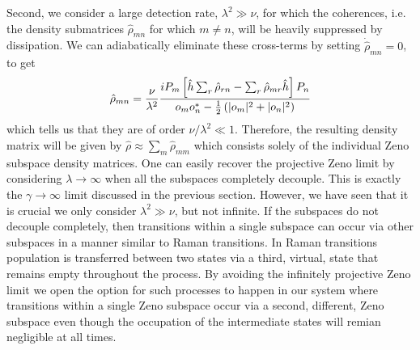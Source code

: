 Second, we consider a large detection rate, $\lambda^2 \gg \nu$, for
which the coherences, i.e.~ the density submatrices $\hat{\rho}_{mn}$
for which $m \ne n$, will be heavily suppressed by dissipation. We can
adiabatically eliminate these cross-terms by setting
$\dot{\hat{\rho}}_{mn} = 0$, to get
\begin{equation}
\label{eq:intermediate}
\hat{\rho}_{mn} = \frac{\nu}{\lambda^2} \frac{i P_m \left[ \hat{h} \sum_r \hat{\rho}_{rn} - \sum_r \hat{\rho}_{mr} \hat{h} \right] P_n } {o_m o_n^* - \frac{1}{2} \left( |o_m|^2 + |o_n|^2 \right)}
\end{equation}
which tells us that they are of order $\nu/\lambda^2 \ll
1$. Therefore, the resulting density matrix will be given by
$\hat{\rho} \approx \sum_m \hat{\rho}_{mm}$ which consists solely of
the individual Zeno subspace density matrices. One can easily recover
the projective Zeno limit by considering $\lambda \rightarrow \infty$
when all the subspaces completely decouple. This is exactly the
$\gamma \rightarrow \infty$ limit discussed in the previous
section. However, we have seen that it is crucial we only consider
$\lambda^2 \gg \nu$, but not infinite. If the subspaces do not
decouple completely, then transitions within a single subspace can
occur via other subspaces in a manner similar to Raman transitions. In
Raman transitions population is transferred between two states via a
third, virtual, state that remains empty throughout the process. By
avoiding the infinitely projective Zeno limit we open the option for
such processes to happen in our system where transitions within a
single Zeno subspace occur via a second, different, Zeno subspace even
though the occupation of the intermediate states will remian
negligible at all times.

